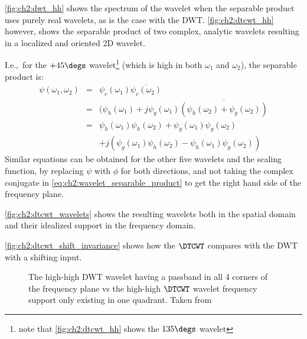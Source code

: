   \autoref{fig:ch2:dwt_hh} shows the spectrum of
  the wavelet when the separable product uses purely real wavelets, as is the
  case with the DWT\@. \autoref{fig:ch2:dtcwt_hh} however, shows the separable
  product of two complex, analytic wavelets resulting in a localized and
  oriented 2D wavelet.  
  
  I.e.,\ for the $+45\degs$ wavelet\footnote{note that \autoref{fig:ch2:dtcwt_hh}
  shows the $135\degs$ wavelet} (which is high
  in both $\omega_1$ and $\omega_2$), the separable product is:
  \begin{eqnarray}
    \psi(\omega_1,\omega_2) & = & \psi_c (\omega_1) \overline{\psi_c
      (\omega_2) } \label{eq:ch2:wavelet_separable_product}\\
    & = & (\psi_h(\omega_1) + j \psi_g(\omega_1) \overline{\left(\psi_h(\omega_2)
      + \psi_g(\omega_2) \right)} \nonumber\\
    & = & \psi_h(\omega_1) \psi_h(\omega_2) + \psi_g(\omega_1)
      \psi_g(\omega_2)\nonumber\\
    &&  + j\left( \psi_g(\omega_1) \psi_h(\omega_2) - \psi_h(\omega_1)
        \psi_g(\omega_2) \right)  \label{eq:ch2:dtcwt_2d_product}
  \end{eqnarray}
  Similar equations can be obtained for the other five wavelets and the scaling
  function, by replacing
  $\psi$ with $\phi$ for both directions, and not taking the complex conjugate
  in \eqref{eq:ch2:wavelet_separable_product} to get the right hand side of the
  frequency plane. 
  
  \autoref{fig:ch2:dtcwt_wavelets} shows the resulting wavelets both in the spatial
  domain and their idealized support in the frequency domain.

  \autoref{fig:ch2:dtcwt_shift_invariance} shows how the $\DTCWT$ compares with the
  DWT with a shifting input.

  \begin{figure}
      \subfloat[]{\makebox[\textwidth][c]{%
        \label{fig:ch2:dwt_hh}}}
      \newline
      \subfloat[]{\makebox[\textwidth][c]{%
        \label{fig:ch2:dtcwt_hh}}}
      \caption[The DWT high-high vs the $\DTCWT$ high-high frequency support]
              { The high-high DWT wavelet having a passband in
              all 4 corners of the frequency plane vs  the
              high-high $\DTCWT$ wavelet frequency support only existing in one
              quadrant. Taken from \citep{selesnick_dual-tree_2005}}
      \label{fig:ch2:dwt_dtcwt_hh}
  \end{figure}

